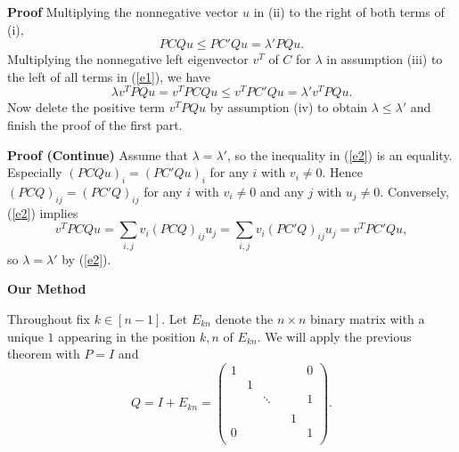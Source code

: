 \documentclass{beamer}
\theoremstyle{plain}
\theoremstyle{definition}
\begin{document}
\begin{frame}{\bf Proof}
            Multiplying the nonnegative vector $u$ in (ii) to the right of both terms of  (i),
        \begin{equation}\label{e1}
            PCQu\leq PC'Qu=\lambda'PQu.
        \end{equation}
        Multiplying the nonnegative left eigenvector $v^T$ of $C$ for $\lambda$ in assumption (iii) to the left of all terms  in (\ref{e1}), we have
        \begin{equation}\label{e2}
            \lambda v^TPQu=v^TPCQu\leq v^TPC'Qu=\lambda' v^TPQu.
        \end{equation}
        Now delete the positive term $v^TPQu$ by assumption (iv) to obtain $\lambda\leq \lambda'$ and finish the proof of the first part.
\end{frame}

\begin{frame}{\bf Proof (Continue)}
        Assume that $\lambda=\lambda'$, so the inequality in (\ref{e2}) is an equality.  Especially $(PCQu)_i=(PC'Qu)_i$ for any $i$ with $v_i\not=0.$ Hence $(PCQ)_{ij}=(PC'Q)_{ij}$ for any $i$ with $v_i\not=0$ and any $j$ with $u_j\not=0.$
        Conversely, (\ref{e2}) implies $$v^TPCQu=\sum_{i,j} v_i(PCQ)_{ij}u_j=\sum_{i,j} v_i(PC'Q)_{ij}u_j=v^TPC'Qu,$$ so
            $\lambda=\lambda'$ by (\ref{e2}).
\end{frame}

\begin{frame}{\bf Our Method}


 Throughout fix $k\in [n-1]$. Let $E_{kn}$ denote the $n\times n$ binary matrix with a unique $1$ appearing in the  position $k,n$ of $E_{kn}$. We will apply the previous theorem with $P=I$ and $$Q=I+E_{kn}=\begin{pmatrix}
1 &  & & &  & 0 \\
 & 1 &  &      &  &  \\
 &  & \ddots & &  & 1 \\
 &  &        & &  &  \\
  &  & & & 1 &  \\
0 &  & & &  & 1 \\
\end{pmatrix}.$$

\end{frame}
\end{document}
